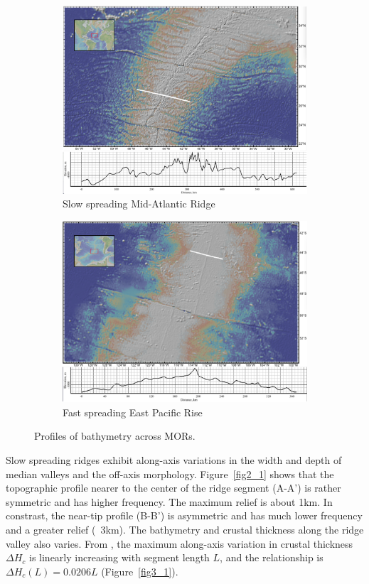\documentclass[12pt]{article}
\begin{document}
\begin{figure}[H]
\centering
\begin{subfigure}{.5\textwidth}
  \centering
  \includegraphics[width=.8\linewidth]{fig1_1.png}
  \caption{\small{Slow spreading Mid-Atlantic Ridge}}
  \label{fig1_1}
\end{subfigure}%
\begin{subfigure}{.5\textwidth}
  \centering
  \includegraphics[width=.8\linewidth]{fig1_3.png}
  \caption{\small{Fast spreading East Pacific Rise}}
  \label{fig1_3}
\end{subfigure}
\caption{\small{Profiles of bathymetry across MORs.}}
\label{fig1}
\end{figure}
Slow spreading ridges exhibit along-axis variations in the width and depth of median valleys and the off-axis morphology.  Figure~\ref{fig2_1} shows that the topographic profile nearer to the center of the ridge segment (A-A') is rather symmetric and has higher frequency. The maximum relief is about 1km. In constrast, the near-tip profile (B-B') is asymmetric and has much lower frequency and a greater relief (~3km). The bathymetry and crustal thickness along the ridge valley also varies. From \citep{Chen1999}, the maximum along-axis variation in crustal thickness $\Delta H_{c}$ is linearly increasing with segment length $L$, and the relationship is $\Delta H_{c}(L)=0.0206L$ (Figure~\ref{fig3_1}).
\end{document}
